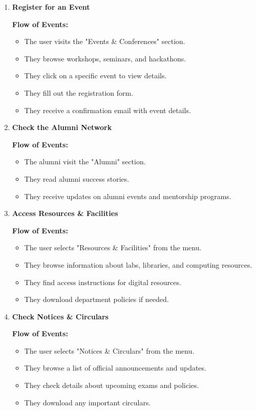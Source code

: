 \documentclass[11pt]{article}
\begin{document}
\begin{enumerate}
    \item \textbf{Register for an Event} \par
    \textbf{Flow of Events:}
    \begin{itemize}
        \item The user visits the "Events \& Conferences" section.
        \item They browse workshops, seminars, and hackathons.
        \item They click on a specific event to view details.
        \item They fill out the registration form.
        \item They receive a confirmation email with event details.
    \end{itemize}

    \item \textbf{Check the Alumni Network} \par
    \textbf{Flow of Events:}
    \begin{itemize}
        \item The alumni visit the "Alumni" section.
        \item They read alumni success stories.
        \item They receive updates on alumni events and mentorship programs.
    \end{itemize}

    \item \textbf{Access Resources \& Facilities} \par
    \textbf{Flow of Events:}
    \begin{itemize}
        \item The user selects "Resources \& Facilities" from the menu.
        \item They browse information about labs, libraries, and computing resources.
        \item They find access instructions for digital resources.
        \item They download department policies if needed.
    \end{itemize}

    \item \textbf{Check Notices \& Circulars} \par
    \textbf{Flow of Events:}
    \begin{itemize}
        \item The user selects "Notices \& Circulars" from the menu.
        \item They browse a list of official announcements and updates.
        \item They check details about upcoming exams and policies.
        \item They download any important circulars.
    \end{itemize}


\end{enumerate}
\end{document}
